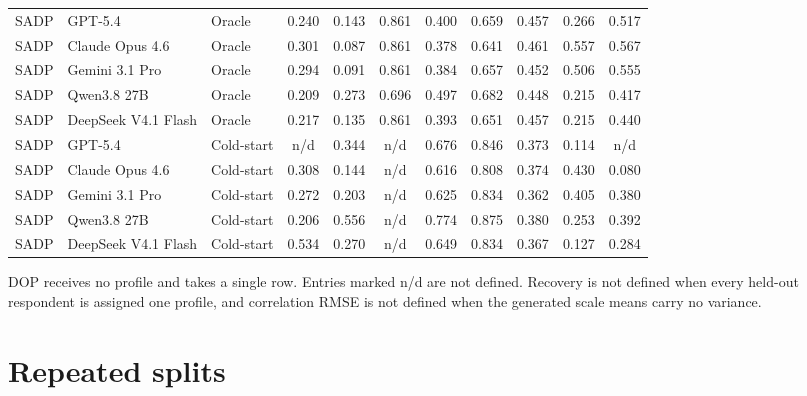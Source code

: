 \begin{table}[pos=!htbp]
\begin{tabular*}{\textwidth}{@{\extracolsep{\fill}}lllcccccccc@{}}
\addlinespace[2pt]
SADP & GPT-5.4 & Oracle & 0.240 & 0.143 & 0.861 & 0.400 & 0.659 & 0.457 & 0.266 & 0.517 \\
SADP & Claude Opus 4.6 & Oracle & 0.301 & 0.087 & 0.861 & 0.378 & 0.641 & 0.461 & 0.557 & 0.567 \\
SADP & Gemini 3.1 Pro & Oracle & 0.294 & 0.091 & 0.861 & 0.384 & 0.657 & 0.452 & 0.506 & 0.555 \\
SADP & Qwen3.8 27B & Oracle & 0.209 & 0.273 & 0.696 & 0.497 & 0.682 & 0.448 & 0.215 & 0.417 \\
SADP & DeepSeek V4.1 Flash & Oracle & 0.217 & 0.135 & 0.861 & 0.393 & 0.651 & 0.457 & 0.215 & 0.440 \\
SADP & GPT-5.4 & Cold-start & n/d & 0.344 & n/d & 0.676 & 0.846 & 0.373 & 0.114 & n/d \\
SADP & Claude Opus 4.6 & Cold-start & 0.308 & 0.144 & n/d & 0.616 & 0.808 & 0.374 & 0.430 & 0.080 \\
SADP & Gemini 3.1 Pro & Cold-start & 0.272 & 0.203 & n/d & 0.625 & 0.834 & 0.362 & 0.405 & 0.380 \\
SADP & Qwen3.8 27B & Cold-start & 0.206 & 0.556 & n/d & 0.774 & 0.875 & 0.380 & 0.253 & 0.392 \\
SADP & DeepSeek V4.1 Flash & Cold-start & 0.534 & 0.270 & n/d & 0.649 & 0.834 & 0.367 & 0.127 & 0.284 \\
\bottomrule
\end{tabular*}
\par\smallskip
\scriptsize DOP receives no profile and takes a single row. Entries marked n/d are not defined. Recovery is not defined when every held-out respondent is assigned one profile, and correlation RMSE is not defined when the generated scale means carry no variance.
\end{table}

\clearpage

\section{Repeated splits}
\label{app:b}

